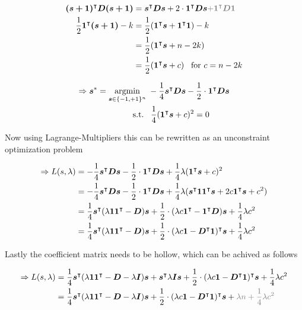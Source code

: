 \begin{align*}
    \trn{\vec{(s+1)}} \mat{D} \vec{(s+1)} &= \trn{\vec{s}} \mat{D} \vec{s} + 2 \cdot \trn{\vec{1}} \mat{D} \vec{s} \textcolor{gray}{ + \trn{\vec{1}} \mat{D} \vec{1}} \\
    \frac12 \ipt{\vec{1}}{\vec{(s+1)}} - k &= \frac12 (\ipt{\vec{1}}{\vec{s}} + \ipt{\vec{1}}{\vec{1}}) - k \\
        &= \frac12 (\ipt{\vec{1}}{\vec{s}} + n - 2 k) \\
        &= \frac12 (\ipt{\vec{1}}{\vec{s}} + c) \;\;\;\text{for $c = n - 2k$}
\end{align*}

$$
\begin{aligned}
\Rightarrow \bm{s}^* = \operatorname*{argmin}_{\bm{s} \in \{ -1, +1 \}^n} & \; -\frac14 \bm{s}^\intercal \bm{D} \bm{s} - \frac12 \cdot \bm{1}^\intercal \bm{D} \bm{s} \\
\operatorname{s.\!t.} \; & \; \; \frac14 (\bm{1}^\intercal \bm{s} + c)^2 = 0
\end{aligned}
$$

Now using Lagrange-Multipliers this can be rewritten as an unconstraint optimization problem

\begin{align*}
    \Rightarrow L(s, \lambda) &= -\frac14 \bm{s}^\intercal \bm{D} \bm{s} - \frac12 \cdot \bm{1}^\intercal \bm{D} \bm{s} + \frac14 \lambda (\bm{1}^\intercal \bm{s} + c)^2 \\
    &= -\frac14 \bm{s}^\intercal \bm{D} \bm{s} - \frac12 \cdot \bm{1}^\intercal \bm{D} \bm{s} + \frac14 \lambda (\bm{s}^\intercal \bm{1}\bm{1}^\intercal \bm{s} + 2c\bm{1}^\intercal \bm{s} + c^2) \\
    &= \frac14 \bm{s}^\intercal (\lambda\bm{1}\bm{1}^\intercal -\bm{D}) \bm{s} + \frac12 \cdot (\lambda c\bm{1}^\intercal - \bm{1}^\intercal \bm{D}) \bm{s} + \frac14 \lambda c^2 \\
    &= \frac14 \bm{s}^\intercal (\lambda\bm{1}\bm{1}^\intercal -\bm{D}) \bm{s} + \frac12 \cdot (\lambda c\bm{1} - \bm{D}^\intercal \bm{1})^\intercal \bm{s} + \frac14 \lambda c^2 \\
\end{align*}

Lastly the coefficient matrix needs to be hollow, which can be achived as follows

\begin{align*}
    \Rightarrow L(s, \lambda) &= \frac14 \trn{\vec{s}} (\lambda\vec{1}\trn{\vec{1}} - \mat{D} -\lambda \mat{I}) \vec{s} + \trn{\vec{s}} \lambda\mat{I} \vec{s} + \frac12 \cdot \trn{(\lambda c\vec{1} - \trn{\vec{D}} \mat{1})} \vec{s} + \frac14 \lambda c^2 \\
    &= \frac14 \trn{\vec{s}} (\lambda\vec{1}\trn{\vec{1}} - \mat{D} -\lambda \mat{I}) \vec{s} + \frac12 \cdot \trn{(\lambda c\vec{1} - \trn{\vec{D}} \mat{1})} \vec{s} + \textcolor{gray}{\lambda n + \frac14 \lambda c^2}
\end{align*}

